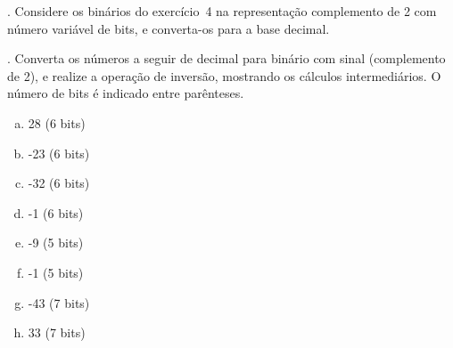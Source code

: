 \bigskip
{}. Considere os binários do exercício~4 na representação complemento de 2 
com número variável de bits, e converta-os para a base decimal.

\medskip{}. Converta os números a seguir de decimal para
binário com sinal (complemento de 2), e realize a operação de
inversão, mostrando os cálculos intermediários. O número de bits é
indicado entre parênteses.

\begin{enumerate}[a)]
\item 28 (6 bits)
\item -23 (6 bits)
\item -32 (6 bits)
\item -1 (6 bits)
\item -9 (5 bits)
\item -1 (5 bits)
\item -43 (7 bits)
\item 33 (7 bits)
\end{enumerate}
